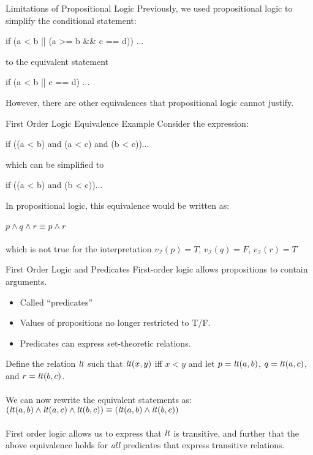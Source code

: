 \documentclass[style=sailor,size=12pt]{powerdot}
\newcommand{\id}[1]{\mbox{\it #1\/}}
\theoremstyle{definition}
\newenvironment{ex}[1]
  {\renewcommand\theinnerexample{#1}\innerexample}
  {\endinnerexample}
\begin{document}
\begin{wideslide}[bm=,toc=]{Limitations of Propositional Logic}
Previously, we used propositional logic to simplify the conditional statement:
\begin{program}
if (a < b || (a >= b \&\& c == d)) ...
\end{program}
to the equivalent statement
\vspace{-1em}
\begin{program}
if (a < b || c == d) ...
\end{program}
However, there are other equivalences that propositional logic cannot justify.
\end{wideslide}

\begin{wideslide}[bm=,toc=]{First Order Logic Equivalence Example}
Consider the expression:
\begin{program}
if ((a < b) and (a < c) and (b < c))...
\end{program}
which can be simplified to
\vspace{-1em}
\begin{program}
if ((a < b) and (b < c))...
\end{program}
\vspace{-1em}
In propositional logic, this equivalence would be written as:\\~\\
$p \land q \land r \equiv p \land r$\\~\\
which is not true for the interpretation $v_{\mathcal{I}}(p) = T$,
   $v_{\mathcal{I}}(q) = F$, $v_{\mathcal{I}}(r) = T$
\end{wideslide}

\begin{wideslide}[bm=,toc=]{First Order Logic and Predicates}
First-order logic allows propositions to contain arguments.
\begin{itemize}
\item Called ``predicates''
\item Values of propositions no longer restricted to T/F.
\item Predicates can express set-theoretic relations.
\end{itemize}
\begin{ex}{}[Ullman]
Define the relation $\id{lt}$ such that $\id{lt}(x,y)$ iff $x < y$ and let $p = \id{lt}(a,b)$, $q = \id{lt}(a,c)$, and $r = \id{lt}(b,c)$.
\\~\\
We can now rewrite the equivalent statements as:\\
$(\id{lt}(a,b) \land \id{lt}(a,c) \land \id{lt}(b,c)) \equiv (\id{lt}(a,b) \land \id{lt}(b,c))$
\\~\\
First order logic allows us to express that $\id{lt}$ is transitive, and further that the above
equivalence holds for \emph{all} predicates that express transitive relations.
\end{ex}
\end{wideslide}
\end{document}
